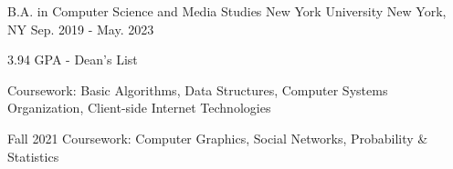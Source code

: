 

\begin{cventries}

  \cventry
    {B.A. in Computer Science and Media Studies} %
    {New York University} %
    {New York, NY} %
    {Sep. 2019 - May. 2023} %
    {
      \begin{cvitems} %
        \item {3.94 GPA - Dean's List}
        \item {Coursework: Basic Algorithms, Data Structures, Computer Systems Organization, Client-side Internet Technologies}
        \item {Fall 2021 Coursework: Computer Graphics, Social Networks, Probability \& Statistics}
      \end{cvitems}
    }

\end{cventries}
